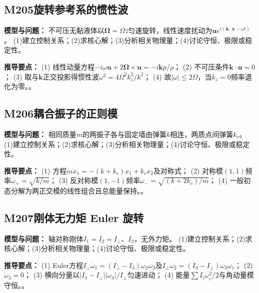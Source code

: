 \par\medskip

\subsection*{M205\quad 旋转参考系的惯性波}

\textbf{模型与问题：} 不可压无黏液体以$\boldsymbol\Omega=\Omega\hat z$匀速旋转，线性速度扰动为$\mathbf u e^{i(\mathbf k\cdot\mathbf x-\omega t)}$。 (1)建立控制关系；(2)求核心解；(3)分析相关物理量；(4)讨论守恒、极限或稳定性。

\par\textbf{推导要点：} (1) 线性动量方程$-i\omega\mathbf u+2\boldsymbol\Omega\times\mathbf u=-i\mathbf k p/\rho$； (2) 不可压条件$\mathbf k\cdot\mathbf u=0$； (3) 取与$\mathbf k$正交投影得惯性波$\omega^2=4\Omega^2k_z^2/k^2$； (4) 故$|\omega|\le2\Omega$，当$k_z=0$频率退化为零。。

\par\medskip

\subsection*{M206\quad 耦合振子的正则模}

\textbf{模型与问题：} 相同质量$m$的两振子各与固定墙由弹簧$k$相连，两质点间弹簧$k_c$。 (1)建立控制关系；(2)求核心解；(3)分析相关物理量；(4)讨论守恒、极限或稳定性。

\par\textbf{推导要点：} (1) 方程$m\ddot x_1=-(k+k_c)x_1+k_cx_2$及对称式； (2) 对称模$(1,1)$频率$\omega_+=\sqrt{k/m}$； (3) 反对称模$(1,-1)$频率$\omega_-=\sqrt{(k+2k_c)/m}$； (4) 一般初态分解为两正交模的线性组合且总能量保持。。

\par\medskip

\subsection*{M207\quad 刚体无力矩 Euler 旋转}

\textbf{模型与问题：} 轴对称刚体$I_1=I_2=I_\perp$、$I_3$，无外力矩。 (1)建立控制关系；(2)求核心解；(3)分析相关物理量；(4)讨论守恒、极限或稳定性。

\par\textbf{推导要点：} (1) Euler方程$I_\perp\dot\omega_1=(I_\perp-I_3)\omega_2\omega_3$及$I_\perp\dot\omega_2=(I_3-I_\perp)\omega_3\omega_1$； (2) $\dot\omega_3=0$； (3) 横向分量以$|I_3-I_\perp||\omega_3|/I_\perp$匀速进动； (4) 能量$\sum I_i\omega_i^2/2$与角动量模守恒。。


